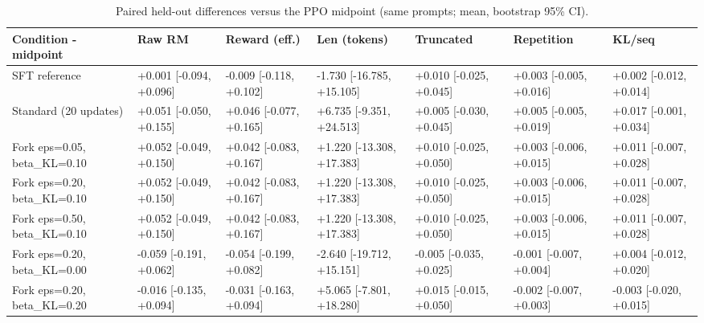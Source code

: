 \begin{table}[t]
\centering
\small
\caption{Paired held-out differences versus the PPO midpoint (same prompts; mean, bootstrap 95\% CI).}
\begin{tabular}{lllllll}
\toprule
Condition - midpoint & Raw RM & Reward (eff.) & Len (tokens) & Truncated & Repetition & KL/seq \\
\midrule
SFT reference & +0.001 [-0.094, +0.096] & -0.009 [-0.118, +0.102] & -1.730 [-16.785, +15.105] & +0.010 [-0.025, +0.045] & +0.003 [-0.005, +0.016] & +0.002 [-0.012, +0.014] \\
Standard (20 updates) & +0.051 [-0.050, +0.155] & +0.046 [-0.077, +0.165] & +6.735 [-9.351, +24.513] & +0.005 [-0.030, +0.045] & +0.005 [-0.005, +0.019] & +0.017 [-0.001, +0.034] \\
Fork eps=0.05, beta\_KL=0.10 & +0.052 [-0.049, +0.150] & +0.042 [-0.083, +0.167] & +1.220 [-13.308, +17.383] & +0.010 [-0.025, +0.050] & +0.003 [-0.006, +0.015] & +0.011 [-0.007, +0.028] \\
Fork eps=0.20, beta\_KL=0.10 & +0.052 [-0.049, +0.150] & +0.042 [-0.083, +0.167] & +1.220 [-13.308, +17.383] & +0.010 [-0.025, +0.050] & +0.003 [-0.006, +0.015] & +0.011 [-0.007, +0.028] \\
Fork eps=0.50, beta\_KL=0.10 & +0.052 [-0.049, +0.150] & +0.042 [-0.083, +0.167] & +1.220 [-13.308, +17.383] & +0.010 [-0.025, +0.050] & +0.003 [-0.006, +0.015] & +0.011 [-0.007, +0.028] \\
Fork eps=0.20, beta\_KL=0.00 & -0.059 [-0.191, +0.062] & -0.054 [-0.199, +0.082] & -2.640 [-19.712, +15.151] & -0.005 [-0.035, +0.025] & -0.001 [-0.007, +0.004] & +0.004 [-0.012, +0.020] \\
Fork eps=0.20, beta\_KL=0.20 & -0.016 [-0.135, +0.094] & -0.031 [-0.163, +0.094] & +5.065 [-7.801, +18.280] & +0.015 [-0.015, +0.050] & -0.002 [-0.007, +0.003] & -0.003 [-0.020, +0.015] \\
\bottomrule
\end{tabular}
\end{table}
